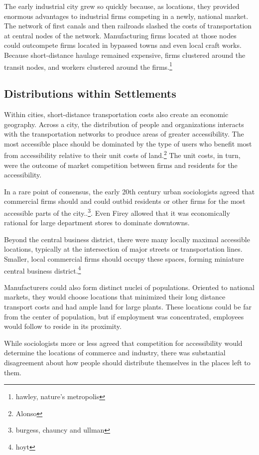 The early industrial city grew so quickly because, as locations, they
provided enormous advantages to industrial firms competing in a newly,
national market. The network of first canals and then railroads
slashed the costs of transportation at central nodes of the
network. Manufacturing firms located at those nodes could outcompete
firms located in bypassed towns and even local craft works. Because
short-distance haulage remained expensive, firms clustered around the
transit nodes, and workers clustered around the
firms.\footnote{hawley, nature's metropolis}

\subsection*{Distributions within Settlements}
Within cities, short-distance transportation costs also create an economic
geography. Across a city, the distribution of people and organizations
interacts with the transportation networks to produce areas of greater
accessibility. The most accessible place should be dominated by the
type of users who benefit most from accessibility relative to their
unit costs of land.\footnote{Alonso} The unit costs, in turn, were the
outcome of market competition between firms and residents for the
accessibility.

In a rare point of consensus, the early 20th century urban
sociologists agreed that commercial firms should and could outbid
residents or other firms for the most accessible parts of the
city..\footnote{burgess, chauncy and ullman}. Even Firey allowed that
it was economically rational for large department stores to dominate
downtowns.

Beyond the central business district, there were many locally maximal
accessible locations, typically at the intersection of major streets
or transportation lines. Smaller, local commercial firms should occupy
these spaces, forming miniature central business district.\footnote{hoyt}

Manufacturers could also form distinct nuclei of populations. Oriented
to national markets, they would choose locations that minimized their
long distance transport costs and had ample land for large
plants. These locations could be far from the center of population,
but if employment was concentrated, employees would follow to reside
in its proximity.

While sociologists more or less agreed that competition for
accessibility would determine the locations of commerce and industry,
there was substantial disagreement about how people should distribute
themselves in the places left to them.

